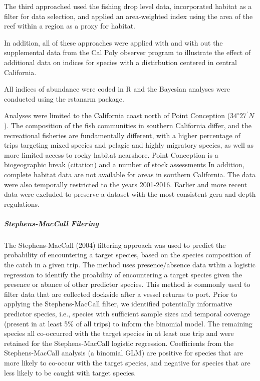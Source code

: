 \documentclass[]{elsarticle} %
\begin{document}
The third approached used the fishing drop level data, incorporated
habitat as a filter for data selection, and applied an area-weighted
index using the area of the reef within a region as a proxy for habitat.

In addition, all of these approaches were applied with and with out the
supplemental data from the Cal Poly observer program to illustrate the
effect of additional data on indices for species with a distirbution
centered in central California.

All indices of abundance were coded in R and the Bayesian analyses were
conducted using the rstanarm package.

Analyses were limited to the California coast north of Point Conception
(\(34^\circ 27^\prime N\)). The composition of the fish communities in
southern California differ, and the recreational fisheries are
fundamentally different, with a higher percentage of trips targeting
mixed species and pelagic and highly migratory species, as well as more
limited access to rocky habitat nearshore. Point Conception is a
biogeographic break (citation) and a number of stock assessments In
addition, complete habitat data are not available for areas in southern
California. The data were also temporally restricted to the years
2001-2016. Earlier and more recent data were excluded to preserve a
dataset with the most consistent gera and depth regulations.

\hypertarget{stephens-maccall-filering}{%
\subparagraph{Stephens-MacCall
Filering}\label{stephens-maccall-filering}}

The Stephens-MacCall (2004) filtering approach was used to predict the
probability of encountering a target species, based on the species
composition of the catch in a given trip. The method uses
presence/absence data wthin a logistic regression to identify the
proability of encountering a target species given the presence or abance
of other predictor species. This method is commonly used to filter data
that are collected dockside after a vessel returns to port. Prior to
applying the Stephens-MacCall filter, we identified potentially
informative predictor species, i.e., species with sufficient sample
sizes and temporal coverage (present in at least 5\% of all trips) to
inform the binomial model. The remaining species all co-occurred with
the target species in at least one trip and were retained for the
Stephens-MacCall logistic regression. Coefficients from the
Stephens-MacCall analysis (a binomial GLM) are positive for species that
are more likely to co-occur with the target species, and negative for
species that are less likely to be caught with target species.
\end{document}
